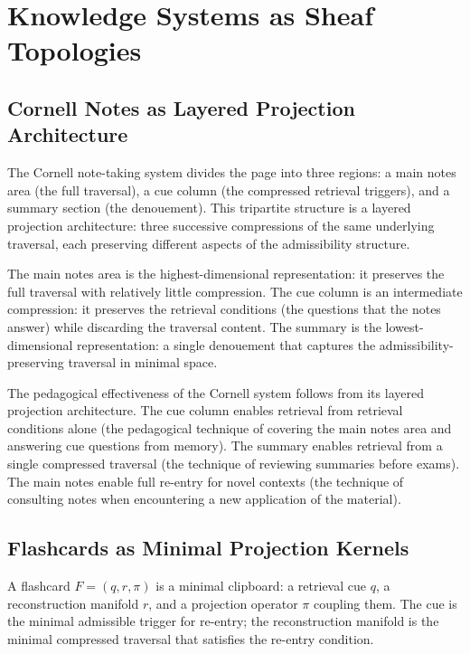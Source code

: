 \documentclass[12pt,oneside]{book}
\theoremstyle{plain}
\theoremstyle{definition}
\theoremstyle{plain}
\begin{document}
\chapter{Knowledge Systems as Sheaf Topologies}
\label{ch:knowledge_systems}

\section{Cornell Notes as Layered Projection Architecture}

The Cornell note-taking system divides the page into three regions: a main notes area (the full traversal), a cue column (the compressed retrieval triggers), and a summary section (the denouement). This tripartite structure is a layered projection architecture: three successive compressions of the same underlying traversal, each preserving different aspects of the admissibility structure.

The main notes area is the highest-dimensional representation: it preserves the full traversal with relatively little compression. The cue column is an intermediate compression: it preserves the retrieval conditions (the questions that the notes answer) while discarding the traversal content. The summary is the lowest-dimensional representation: a single denouement that captures the admissibility-preserving traversal in minimal space.

The pedagogical effectiveness of the Cornell system follows from its layered projection architecture. The cue column enables retrieval from retrieval conditions alone (the pedagogical technique of covering the main notes area and answering cue questions from memory). The summary enables retrieval from a single compressed traversal (the technique of reviewing summaries before exams). The main notes enable full re-entry for novel contexts (the technique of consulting notes when encountering a new application of the material).

\section{Flashcards as Minimal Projection Kernels}

A flashcard $F = (q, r, \pi)$ is a minimal clipboard: a retrieval cue $q$, a reconstruction manifold $r$, and a projection operator $\pi$ coupling them. The cue is the minimal admissible trigger for re-entry; the reconstruction manifold is the minimal compressed traversal that satisfies the re-entry condition.
\end{document}
